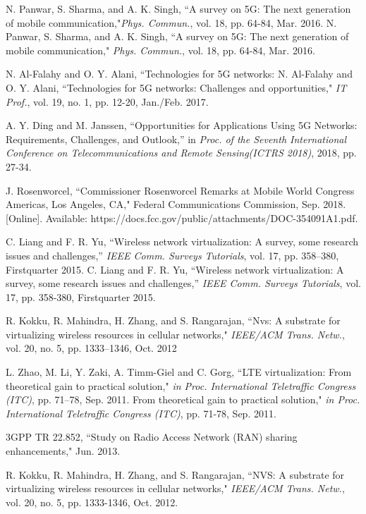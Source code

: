 \documentclass[journal]{IEEEtran}
\begin{document}
\begin{IEEEkeywords}
\begin{thebibliography}{1}	
N. Panwar, S. Sharma, and A. K. Singh, ``A survey on 5G: The
next generation of mobile communication,"\emph{Phys. Commun.}, vol. 18, pp. 64-84, Mar. 2016.	
 N. Panwar, S. Sharma, and A. K. Singh, ``A survey on 5G: The
next generation of mobile communication," \emph{Phys. Commun.}, vol. 18, pp. 64-84, Mar. 2016.	
	
N. Al-Falahy and O. Y. Alani, ``Technologies for 5G networks:
 N. Al-Falahy and O. Y. Alani, ``Technologies for 5G networks:
Challenges and opportunities," \emph{IT Prof.}, vol. 19, no. 1, pp. 12-20, Jan./Feb. 2017.	

 A. Y. Ding and M. Janssen, ``Opportunities for Applications Using 5G Networks: Requirements, Challenges, and Outlook,” in \emph{Proc. of the Seventh International Conference on Telecommunications and Remote Sensing(ICTRS 2018)}, 2018, pp. 27-34.

 J. Rosenworcel, ``Commissioner Rosenworcel Remarks at Mobile World Congress Americas, Los Angeles, CA," Federal Communications Commission, Sep. 2018. [Online]. Available: https://docs.fcc.gov/public/attachments/DOC-354091A1.pdf.
	
	
C. Liang and F. R. Yu, ``Wireless network virtualization: A survey, some research issues and challenges,” \emph{IEEE Comm. Surveys Tutorials}, vol. 17, pp. 358–380, Firstquarter 2015.
 C. Liang and F. R. Yu, ``Wireless network virtualization: A survey, some research issues and challenges,” \emph{IEEE Comm. Surveys Tutorials}, vol. 17, pp. 358-380, Firstquarter 2015.

R. Kokku, R. Mahindra, H. Zhang, and S. Rangarajan, ``Nvs: A substrate
for virtualizing wireless resources in cellular networks," \emph{IEEE/ACM Trans. Netw.}, vol. 20, no. 5, pp. 1333–1346, Oct. 2012

L. Zhao, M. Li, Y. Zaki, A. Timm-Giel and C. Gorg, ``LTE virtualization:
From theoretical gain to practical solution," \emph{in Proc. International Teletraffic Congress (ITC)}, pp. 71–78, Sep. 2011.
From theoretical gain to practical solution," \emph{in Proc. International Teletraffic Congress (ITC)}, pp. 71-78, Sep. 2011.


3GPP TR 22.852, ``Study on Radio Access Network (RAN) sharing enhancements," Jun. 2013.

 R. Kokku, R. Mahindra, H. Zhang, and S. Rangarajan, ``NVS: A substrate for virtualizing wireless resources in cellular networks," \emph{IEEE/ACM Trans. Netw.}, vol. 20, no. 5, pp. 1333-1346, Oct. 2012.


\end{thebibliography}
\end{IEEEkeywords}
\end{document}
